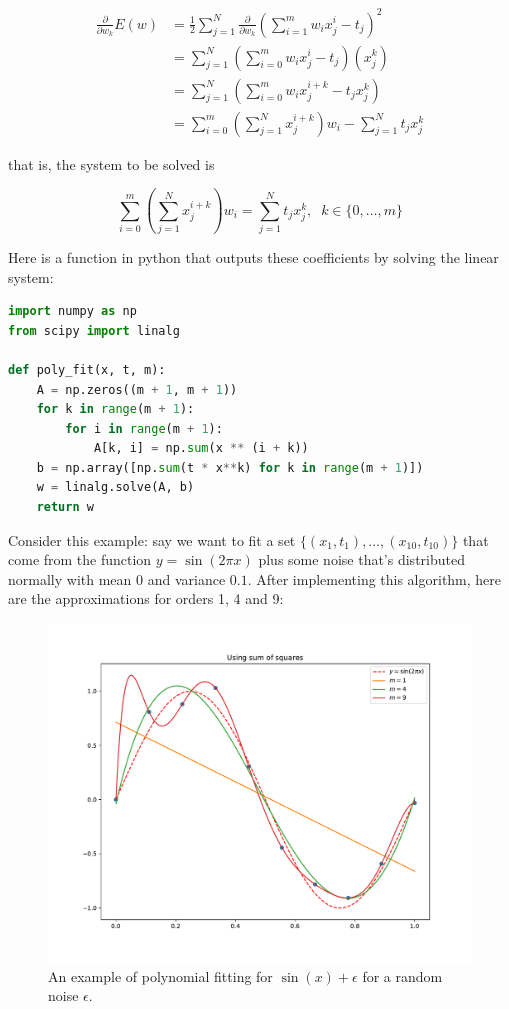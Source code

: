 \begin{align*}
	\frac{\partial}{\partial w_k} E(w) &= \frac{1}{2}\sum_{j=1}^N\frac{\partial}{\partial w_k}\left(\sum_{i=1}^mw_ix_j^i - t_j\right)^2\\
	&= \sum_{j=1}^N \left(\sum_{i=0}^mw_ix_j^i - t_j\right)(x_j^k)\\
	&= \sum_{j=1}^N \left(\sum_{i=0}^mw_ix_j^{i+k} - t_jx_j^k\right)\\
	&= \sum_{i=0}^m\left(\sum_{j=1}^N x_j^{i+k}\right) w_i - \sum_{j=1}^Nt_jx_j^k
\end{align*}

that is, the system to be solved is

\[\sum_{i=0}^m\left(\sum_{j=1}^N x_j^{i+k}\right) w_i = \sum_{j=1}^Nt_jx_j^k,\;\; k\in\{0,\dots,m\}\]

Here is a function in python that outputs these coefficients by solving the linear system:

\begin{mdframed}[backgroundcolor=black!10]
\begin{lstlisting}[language=python]
import numpy as np
from scipy import linalg

def poly_fit(x, t, m):
    A = np.zeros((m + 1, m + 1))
    for k in range(m + 1):
        for i in range(m + 1):
            A[k, i] = np.sum(x ** (i + k))
    b = np.array([np.sum(t * x**k) for k in range(m + 1)])
    w = linalg.solve(A, b)
    return w
\end{lstlisting}	
\end{mdframed}

Consider this example: say we want to fit a set $\{(x_1, t_1),\dots,(x_{10},t_{10})\}$ that come from the function $y=\sin(2\pi x)$ plus some noise that's distributed normally with mean $0$ and variance $0.1$. After implementing this algorithm, here are the approximations for orders 1, 4 and 9:

\begin{figure}[H]
	\centering
	\includegraphics[width=1\textwidth]{images/overfitting.pdf}
	\caption{An example of polynomial fitting for $\sin(x) + \epsilon$ for a random noise $\epsilon$.}
\end{figure}

